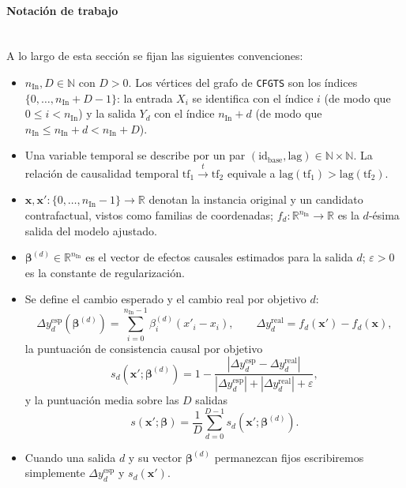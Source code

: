\documentclass[12pt]{report} %
\begin{document}
\paragraph*{Notación de trabajo}\mbox{}\\
A lo largo de esta sección se fijan las siguientes convenciones:
\begin{itemize}
    \item $n_{\text{In}}, D \in \mathbb{N}$ con $D > 0$. Los vértices del grafo de \texttt{CFGTS} son los índices $\{0, \ldots, n_{\text{In}} + D - 1\}$: la entrada $X_i$ se identifica con el índice $i$ (de modo que $0 \leq i < n_{\text{In}}$) y la salida $Y_d$ con el índice $n_{\text{In}} + d$ (de modo que $n_{\text{In}} \leq n_{\text{In}} + d < n_{\text{In}} + D$).
    \item Una variable temporal se describe por un par $(\text{id}_{\text{base}}, \text{lag}) \in \mathbb{N} \times \mathbb{N}$. La relación de causalidad temporal $\mathrm{tf}_1 \xrightarrow{t} \mathrm{tf}_2$ equivale a $\mathrm{lag}(\mathrm{tf}_1) > \mathrm{lag}(\mathrm{tf}_2)$.
    \item $\mathbf{x}, \mathbf{x}' : \{0, \ldots, n_{\text{In}}-1\} \to \mathbb{R}$ denotan la instancia original y un candidato contrafactual, vistos como familias de coordenadas; $f_d : \mathbb{R}^{n_{\text{In}}} \to \mathbb{R}$ es la $d$-ésima salida del modelo ajustado.
    \item $\boldsymbol{\beta}^{(d)} \in \mathbb{R}^{n_{\text{In}}}$ es el vector de efectos causales estimados para la salida $d$; $\varepsilon > 0$ es la constante de regularización.
    \item Se define el cambio esperado y el cambio real por objetivo $d$:
          $$\Delta y_d^{\text{esp}}\!\left(\boldsymbol{\beta}^{(d)}\right) = \sum_{i=0}^{n_{\text{In}}-1} \beta_i^{(d)}(x'_i - x_i), \qquad \Delta y_d^{\text{real}} = f_d(\mathbf{x}') - f_d(\mathbf{x}),$$
          la puntuación de consistencia causal por objetivo
          $$s_d\!\left(\mathbf{x}'; \boldsymbol{\beta}^{(d)}\right) = 1 - \frac{\left|\Delta y_d^{\text{esp}} - \Delta y_d^{\text{real}}\right|}{\left|\Delta y_d^{\text{esp}}\right| + \left|\Delta y_d^{\text{real}}\right| + \varepsilon},$$
          y la puntuación media sobre las $D$ salidas
          $$s\!\left(\mathbf{x}'; \boldsymbol{\beta}\right) = \frac{1}{D}\sum_{d=0}^{D-1} s_d\!\left(\mathbf{x}'; \boldsymbol{\beta}^{(d)}\right).$$
    \item Cuando una salida $d$ y su vector $\boldsymbol{\beta}^{(d)}$ permanezcan fijos escribiremos simplemente $\Delta y_d^{\text{esp}}$ y $s_d(\mathbf{x}')$.
\end{itemize}
\end{document}
